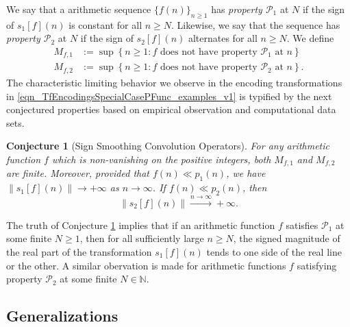 \documentclass[11pt,reqno]{amsart}
\numberwithin{figure}{section}
\numberwithin{table}{section}
\theoremstyle{plain}
\newtheorem{conjecture}[theorem]{Conjecture}
\numberwithin{theorem}{section}
\theoremstyle{definition}
\begin{document}
We say that a arithmetic sequence $\{f(n)\}_{n \geq 1}$ has 
\emph{property $\mathcal{P}_1$} at $N$ if the sign of $s_1[f](n)$ is constant for all $n \geq N$. 
Likewise, we say that the sequence has \emph{property $\mathcal{P}_2$} at $N$ if the sign of 
$s_2[f](n)$ alternates for all $n \geq N$. We define 
\begin{align*} 
M_{f,1} & := \sup \left\{n \geq 1: f \text{\ does not have property\ } \mathcal{P}_1 \text{\ at\ } n\right\} \\ 
M_{f,2} & := \sup \left\{n \geq 1: f \text{\ does not have property\ } \mathcal{P}_2 \text{\ at\ } n\right\}. 
\end{align*} 
The characteristic limiting behavior we observe in the 
encoding transformations in \eqref{eqn_TfEncodingsSpecialCasePFunc_examples_v1} 
is typified by the next conjectured properties based on empirical observation and 
computational data sets. 

\begin{conjecture}[Sign Smoothing Convolution Operators] 
\label{conj_MainTheorem_Stmt_v1} 
For any arithmetic function $f$ which is non-vanishing on the positive integers, 
both $M_{f,1}$ and $M_{f,2}$ are finite. Moreover, provided that $f(n) \ll p_1(n)$, 
we have $\lVert s_1[f](n)\rVert \rightarrow +\infty$ as $n \rightarrow \infty$. If 
$f(n) \ll p_2(n)$, then 
$$\lVert s_2[f](n) \rVert \xrightarrow{n \rightarrow \infty} +\infty.$$ 
\end{conjecture} 

The truth of 
Conjecture \ref{conj_MainTheorem_Stmt_v1} 
implies that if an arithmetic function $f$ satisfies $\mathcal{P}_1$ at some finite $N \geq 1$, then 
for all sufficiently large $n \geq N$, the signed magnitude of the real part of the transformation 
$s_1[f](n)$ tends to one side of the real line or the other. A similar obervation is made for 
arithmetic functions $f$ satisfying property $\mathcal{P}_2$ at some finite $N \in \mathbb{N}$. 

\subsection{Generalizations} 
\end{document}
